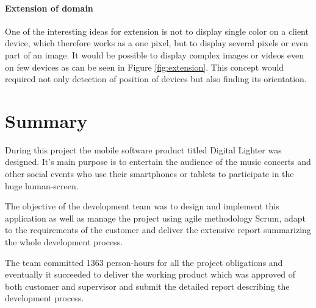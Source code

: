 \paragraph{Extension of domain}
One of the interesting ideas for extension is not to display single color on a client device, which therefore works as a one pixel, but to display several pixels or even part of an image.
It would be possible to display complex images or videos even on few devices as can be seen in Figure \ref{fig:extension}.
This concept would required not only detection of position of devices but also finding its orientation.

\section{Summary}
During this project the mobile software product titled Digital Lighter was designed. It's main purpose is to entertain the audience of the music concerts and other social events who use their smartphones or tablets to participate in the huge human-screen.

The objective of the development team was to design and implement this application as well as manage the project using agile methodology Scrum, adapt to the requirements of the customer and deliver the extensive report summarizing the whole development process.

The team committed 1363 person-hours for all the project obligations and eventually it succeeded to deliver the working product which was approved of both customer and supervisor and submit the detailed report describing the development process.

